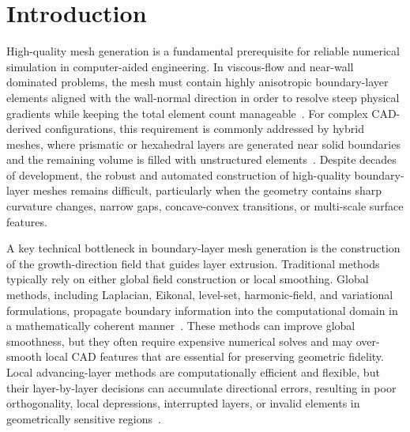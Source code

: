 \documentclass[%
 aip,
 amsmath,amssymb,
 reprint,%
nobibnotes,
]{revtex4-1}
\begin{document}
\maketitle

\section{\label{sec:introduction}Introduction}
High-quality mesh generation is a fundamental prerequisite for reliable numerical simulation in computer-aided engineering. In viscous-flow and near-wall dominated problems, the mesh must contain highly anisotropic boundary-layer elements aligned with the wall-normal direction in order to resolve steep physical gradients while keeping the total element count manageable~\cite{baker2005mesh}. For complex CAD-derived configurations, this requirement is commonly addressed by hybrid meshes, where prismatic or hexahedral layers are generated near solid boundaries and the remaining volume is filled with unstructured elements~\cite{eller2016automated,wang2016hybrid}. Despite decades of development, the robust and automated construction of high-quality boundary-layer meshes remains difficult, particularly when the geometry contains sharp curvature changes, narrow gaps, concave-convex transitions, or multi-scale surface features.

A key technical bottleneck in boundary-layer mesh generation is the construction of the growth-direction field that guides layer extrusion. Traditional methods typically rely on either global field construction or local smoothing. Global methods, including Laplacian, Eikonal, level-set, harmonic-field, and variational formulations, propagate boundary information into the computational domain in a mathematically coherent manner~\cite{zheng2018bem,wang2008eikonal,xia2010levelset,zhu2021harmonic,dyedov2009variational}. These methods can improve global smoothness, but they often require expensive numerical solves and may over-smooth local CAD features that are essential for preserving geometric fidelity. Local advancing-layer methods are computationally efficient and flexible, but their layer-by-layer decisions can accumulate directional errors, resulting in poor orthogonality, local depressions, interrupted layers, or invalid elements in geometrically sensitive regions~\cite{roget2020minimum,eller2016automated}.
\end{document}
